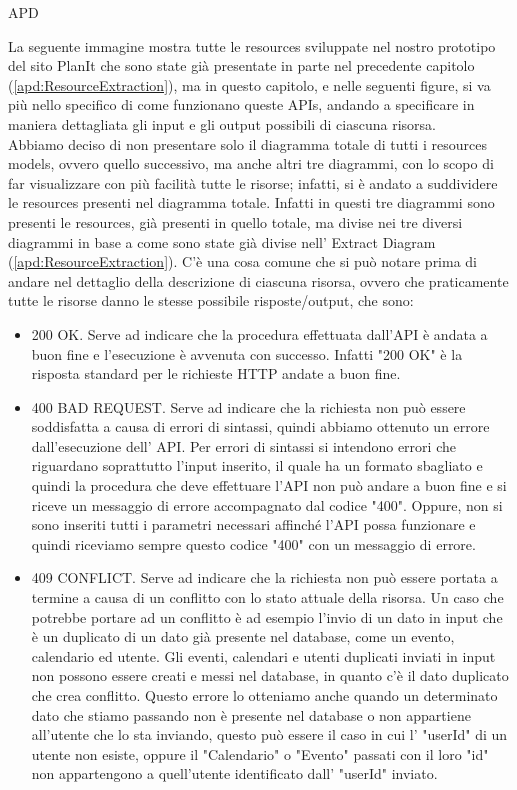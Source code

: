 \begin{listaPersonale} {APD}
\begin{listaPersonale2}[APD]{}
        La seguente immagine mostra tutte le resources sviluppate nel nostro prototipo del sito PlanIt che sono state già presentate in parte nel precedente capitolo (\ref{apd:ResourceExtraction}), ma in questo capitolo, e nelle seguenti figure, si va più nello specifico di come funzionano queste APIs, andando a specificare in maniera dettagliata gli input e gli output possibili di ciascuna risorsa. \\
        Abbiamo deciso di non presentare solo il diagramma totale di tutti i resources models, ovvero quello successivo, ma anche altri tre diagrammi, con lo scopo di far visualizzare con più facilità tutte le risorse; infatti, si è andato a suddividere le resources presenti nel diagramma totale. Infatti in questi tre diagrammi sono presenti le resources, già presenti in quello totale, ma divise nei tre diversi diagrammi in base a come sono state già divise nell' Extract Diagram (\ref{apd:ResourceExtraction}).
        C'è una cosa comune che si può notare prima di andare nel dettaglio della descrizione di ciascuna risorsa, ovvero che praticamente tutte le risorse danno le stesse possibile risposte/output, che sono:
        \begin{itemize}
            \item 200 OK. Serve ad indicare che la procedura effettuata dall'API è andata a buon fine e l'esecuzione è avvenuta con successo. Infatti "200 OK" è la risposta standard per le richieste HTTP andate a buon fine.
            \item 400 BAD REQUEST. Serve ad indicare che la richiesta non può essere soddisfatta a causa di errori di sintassi, quindi abbiamo ottenuto un errore dall'esecuzione dell' API. Per errori di sintassi si intendono errori che riguardano soprattutto l'input inserito, il quale ha un formato sbagliato e quindi la procedura che deve effettuare l'API non può andare a buon fine e si riceve un messaggio di errore accompagnato dal codice "400". Oppure, non si sono inseriti tutti i parametri necessari affinché l'API possa funzionare e quindi riceviamo sempre questo codice "400" con un messaggio di errore.
            \item 409 CONFLICT. Serve ad indicare che la richiesta non può essere portata a termine a causa di un conflitto con lo stato attuale della risorsa. Un caso che potrebbe portare ad un conflitto è ad esempio l'invio di un dato in input che è un duplicato di un dato già presente nel database, come un evento, calendario ed utente. Gli eventi, calendari e utenti duplicati inviati in input non possono essere creati e messi nel database, in quanto c'è il dato duplicato che crea conflitto. Questo errore lo otteniamo anche quando un determinato dato che stiamo passando non è presente nel database o non appartiene all'utente che lo sta inviando, questo può essere il caso in cui l' "userId" di un utente non esiste, oppure il "Calendario" o "Evento" passati con il loro "id" non appartengono a quell'utente identificato dall' "userId" inviato.

\end{itemize}
\end{listaPersonale2}
\end{listaPersonale}
